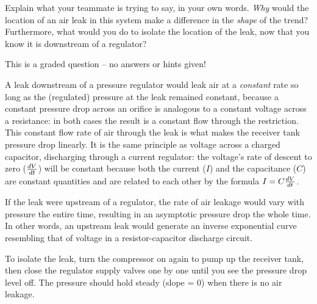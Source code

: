 \vskip 10pt

Explain what your teammate is trying to say, in your own words.  {\it Why} would the location of an air leak in this system make a difference in the {\it shape} of the trend?  Furthermore, what would you do to isolate the location of the leak, now that you know it is downstream of a regulator?

\vfil 

\eject






This is a graded question -- no answers or hints given!







A leak downstream of a pressure regulator would leak air at a {\it constant} rate so long as the (regulated) pressure at the leak remained constant, because a constant pressure drop across an orifice is analogous to a constant voltage across a resistance: in both cases the result is a constant flow through the restriction.  This constant flow rate of air through the leak is what makes the receiver tank pressure drop linearly.  It is the same principle as voltage across a charged capacitor, discharging through a current regulator: the voltage's rate of descent to zero ($dV \over dt$) will be constant because both the current ($I$) and the capacitance ($C$) are constant quantities and are related to each other by the formula $I = C {dV \over dt}$.

If the leak were upstream of a regulator, the rate of air leakage would vary with pressure the entire time, resulting in an asymptotic pressure drop the whole time.  In other words, an upstream leak would generate an inverse exponential curve resembling that of voltage in a resistor-capacitor discharge circuit.

\vskip 10pt

To isolate the leak, turn the compressor on again to pump up the receiver tank, then close the regulator supply valves one by one until you see the pressure drop level off.  The pressure should hold steady (slope = 0) when there is no air leakage.




